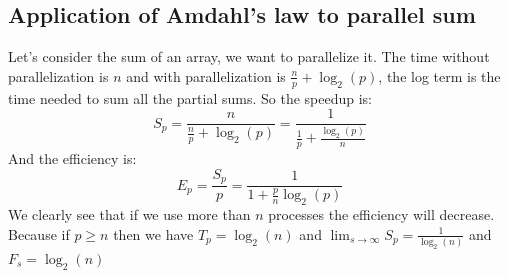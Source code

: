 \documentclass[12pt, openany]{report}
\theoremstyle{definition}
\begin{document}
\subsection{Application of Amdahl's law to parallel sum}
Let's consider the sum of an array, we want to parallelize it. The time without parallelization is $n$ and with parallelization is $\frac{n}{p} + \log_2(p)$, the log term is the time needed to sum all the partial sums. So the speedup is:
\begin{equation}
	S_p = \frac{n}{\frac{n}{p} + \log_2(p)} = \frac{1}{\frac{1}{p} + \frac{\log_2(p)}{n}}
\end{equation}
And the efficiency is:
\begin{equation}
	E_p = \frac{S_p}{p} = \frac{1}{1 + \frac{p}{n}\log_2(p)}
\end{equation}
We clearly see that if we use more than $n$ processes the efficiency will decrease. Because if $p \geq n$ then we have $T_p = \log_2(n)$ and $\lim_{s \to \infty} S_p = \frac{1}{\log_2(n)}$ and $F_s = \log_2(n)$
\end{document}

